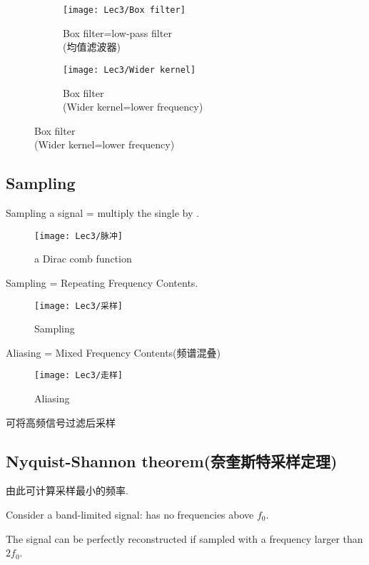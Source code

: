     \begin{figure}[H]
        \centering
        \caption{Examples(二维)}
        \begin{subfigure}{0.24\textwidth}
            \centering
            \texttt{[image: Lec3/Box filter]}
            \caption{Box filter=low-pass filter\\(均值滤波器)}
        \end{subfigure}
        \begin{subfigure}{0.24\textwidth}
            \centering
            \texttt{[image: Lec3/Wider kernel]}
            \caption{Box filter\\(Wider kernel=lower frequency)}
        \end{subfigure}
    \end{figure}

    \subsection{Sampling}
    Sampling a signal = multiply the single by .
    \begin{figure}[H]
        \centering
        \texttt{[image: Lec3/脉冲]}
        \caption{a Dirac comb function}
    \end{figure}

    Sampling = Repeating Frequency Contents.
    \begin{figure}[H]
        \centering
        \texttt{[image: Lec3/采样]}
        \caption{Sampling}
    \end{figure}

    Aliasing = Mixed Frequency Contents(频谱混叠)
    \begin{figure}[H]
        \centering
        \texttt{[image: Lec3/走样]}
        \caption{Aliasing}
    \end{figure}
    可将高频信号过滤后采样

    
    \subsection{Nyquist-Shannon theorem(奈奎斯特采样定理)}
    由此可计算采样最小的频率.

    Consider a band-limited signal: has no frequencies above $f_0$.

    The signal can be perfectly reconstructed if sampled with a frequency larger than $2f_0$.

